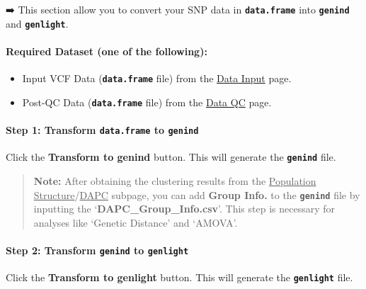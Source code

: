 \documentclass[
]{book}
\begin{document}
➡️ This section allow you to convert your SNP data in {\textbf{\texttt{data.frame}}} into {\textbf{\texttt{genind}}} and {\textbf{\texttt{genlight}}}.

\paragraph*{Required Dataset (one of the following):}\label{required-dataset-one-of-the-following-4}

\begin{itemize}
\item
  Input VCF Data ({\textbf{\texttt{data.frame}}} file) from the \ul{Data Input} page.
\item
  Post-QC Data ({\textbf{\texttt{data.frame}}} file) from the \ul{Data QC} page.
\end{itemize}

\paragraph*{\texorpdfstring{Step 1: Transform {\textbf{\texttt{data.frame}}} to {\textbf{\texttt{genind}}}}{Step 1: Transform data.frame to genind}}\label{step-1-transform-data.frame-to-genind}

Click the {\textbf{Transform to genind}} button. This will generate the {\textbf{\texttt{genind}}} file.

\begin{quote}
\textbf{Note:} After obtaining the clustering results from the \ul{Population Structure}/\ul{DAPC} subpage, you can add \textbf{Group Info.} to the {\textbf{\texttt{genind}}} file by inputting the `\textbf{DAPC\_Group\_Info.csv}'. This step is necessary for analyses like `Genetic Distance' and `AMOVA'.
\end{quote}

\paragraph*{\texorpdfstring{Step 2: Transform {\textbf{\texttt{genind}}} to {\textbf{\texttt{genlight}}}}{Step 2: Transform genind to genlight}}\label{step-2-transform-genind-to-genlight}

Click the {\textbf{Transform to genlight}} button. This will generate the {\textbf{\texttt{genlight}}} file.
\end{document}
